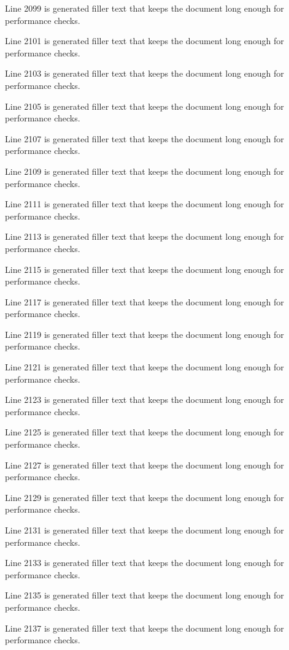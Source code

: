 Line 2099 is generated filler text that keeps the document long enough for performance checks.

Line 2101 is generated filler text that keeps the document long enough for performance checks.

Line 2103 is generated filler text that keeps the document long enough for performance checks.

Line 2105 is generated filler text that keeps the document long enough for performance checks.

Line 2107 is generated filler text that keeps the document long enough for performance checks.

Line 2109 is generated filler text that keeps the document long enough for performance checks.

Line 2111 is generated filler text that keeps the document long enough for performance checks.

Line 2113 is generated filler text that keeps the document long enough for performance checks.

Line 2115 is generated filler text that keeps the document long enough for performance checks.

Line 2117 is generated filler text that keeps the document long enough for performance checks.

Line 2119 is generated filler text that keeps the document long enough for performance checks.

Line 2121 is generated filler text that keeps the document long enough for performance checks.

Line 2123 is generated filler text that keeps the document long enough for performance checks.

Line 2125 is generated filler text that keeps the document long enough for performance checks.

Line 2127 is generated filler text that keeps the document long enough for performance checks.

Line 2129 is generated filler text that keeps the document long enough for performance checks.

Line 2131 is generated filler text that keeps the document long enough for performance checks.

Line 2133 is generated filler text that keeps the document long enough for performance checks.

Line 2135 is generated filler text that keeps the document long enough for performance checks.

Line 2137 is generated filler text that keeps the document long enough for performance checks.

